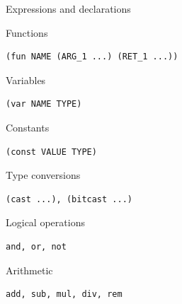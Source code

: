 \documentclass[aspectratio=1610,10.5pt]{beamer} %
\begin{document}
\begin{frame}[fragile]{Expressions and declarations}
    \begin{block}{Functions}
            \begin{verbatim}
(fun NAME (ARG_1 ...) (RET_1 ...))
            \end{verbatim}
    \end{block}
    \begin{block}{Variables}
            \begin{verbatim}
(var NAME TYPE)
            \end{verbatim}
    \end{block}
    \begin{block}{Constants}
            \begin{verbatim}
(const VALUE TYPE)
            \end{verbatim}
    \end{block}
    \begin{block}{Type conversions}
            \begin{verbatim}
(cast ...), (bitcast ...)
            \end{verbatim}
    \end{block}
    \begin{block}{Logical operations}
            \begin{verbatim}
and, or, not
            \end{verbatim}
    \end{block}
    \begin{block}{Arithmetic}
            \begin{verbatim}
add, sub, mul, div, rem
            \end{verbatim}
    \end{block}
\end{frame}
\end{document}
